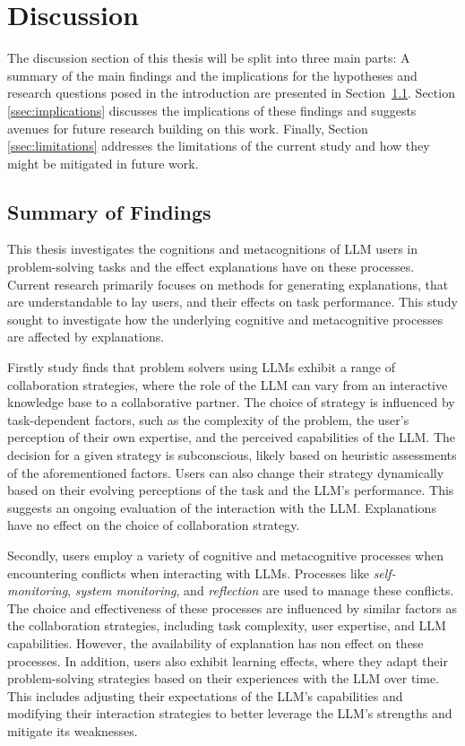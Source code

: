 \section{Discussion} \label{sec:discussion}

The discussion section of this thesis will be split into three main parts: A summary of the main findings and the implications for the hypotheses and research questions posed in the introduction are presented in Section~\ref{ssec:summary}. Section \ref{ssec:implications} discusses the implications of these findings and suggests avenues for future research building on this work. Finally, Section \ref{ssec:limitations} addresses the limitations of the current study and how they might be mitigated in future work.

\subsection{Summary of Findings} \label{ssec:summary}

This thesis investigates the cognitions and metacognitions of LLM users in problem-solving tasks and the effect explanations have on these processes. Current research primarily focuses on methods for generating explanations, that are understandable to lay users, and their effects on task performance. This study sought to investigate how the underlying cognitive and metacognitive processes are affected by explanations.

Firstly study finds that problem solvers using LLMs exhibit a range of collaboration strategies, where the role of the LLM can vary from an interactive knowledge base to a collaborative partner. The choice of strategy is influenced by task-dependent factors, such as the complexity of the problem, the user's perception of their own expertise, and the perceived capabilities of the LLM. The decision for a given strategy is subconscious, likely based on heuristic assessments of the aforementioned factors. Users can also change their strategy dynamically based on their evolving perceptions of the task and the LLM's performance. This suggests an ongoing evaluation of the interaction with the LLM. Explanations have no effect on the choice of collaboration strategy.

Secondly, users employ a variety of cognitive and metacognitive processes when encountering conflicts when interacting with LLMs. Processes like \textit{self-monitoring}, \textit{system monitoring}, and \textit{reflection} are used to manage these conflicts. The choice and effectiveness of these processes are influenced by similar factors as the collaboration strategies, including task complexity, user expertise, and LLM capabilities. However, the availability of explanation has non effect on these processes. In addition, users also exhibit learning effects, where they adapt their problem-solving strategies based on their experiences with the LLM over time. This includes adjusting their expectations of the LLM's capabilities and modifying their interaction strategies to better leverage the LLM's strengths and mitigate its weaknesses.

